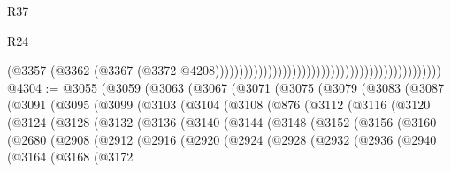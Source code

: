 \begin{lexlean}{R37}
\begin{lexlean}{R24}
\begin{coremodule}
{{{{{{{{{{{{{{{{{{{{{{{{{{{{{{{{{{{{{{{{{{{{{{{{{{{{{{{{{{{{{{{{{{{{{{{{{{{{{{{{{{{{{{{{{{{{{{{{{{{{{{{{{{{{{{{{{{{{{{{{{{{{{{{{{{{{{{{{{{{{{{{{{{{{{{{{{{{{{{{{{{{{{{{{{{{{{{{{{{{{{{{{{                                                                                          (@3357
                                                                                            (@3362
                                                                                              (@3367
                                                                                                (@3372
                                                                                                  @4208)))))))))))))))))))))))))))))))))))))))))))))))
@4304 := @3055
    (@3059
      (@3063
        (@3067
          (@3071
            (@3075
              (@3079
                (@3083
                  (@3087
                    (@3091
                      (@3095
                        (@3099
                          (@3103
                            (@3104
                              (@3108
                                (@876
                                  (@3112
                                    (@3116
                                      (@3120
                                        (@3124
                                          (@3128
                                            (@3132
                                              (@3136
                                                (@3140
                                                  (@3144
                                                    (@3148
                                                      (@3152
                                                        (@3156
                                                          (@3160
                                                            (@2680
                                                              (@2908
                                                                (@2912
                                                                  (@2916
                                                                    (@2920
                                                                      (@2924
                                                                        (@2928
                                                                          (@2932
                                                                            (@2936
                                                                              (@2940
                                                                                (@3164
                                                                                  (@3168
                                                                                    (@3172
}}}}}}}}}}}}}}}}}}}}}}}}}}}}}}}}}}}}}}}}}}}}}}}}}}}}}}}}}}}}}}}}}}}}}}}}}}}}}}}}}}}}}}}}}}}}}}}}}}}}}}}}}}}}}}}}}}}}}}}}}}}}}}}}}}}}}}}}}}}}}}}}}}}}}}}}}}}}}}}}}}}}}}}}}}}}}}}}}}}}}}}}}
\end{coremodule}
\end{lexlean}
\end{lexlean}
